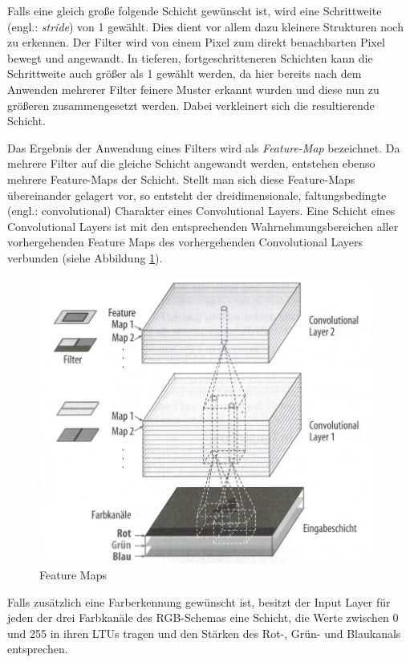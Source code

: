 Falls eine gleich große folgende Schicht gewünscht ist, wird eine Schrittweite (engl.: \textit{stride}) von 1 gewählt. Dies dient vor allem dazu kleinere Strukturen noch zu erkennen. Der Filter wird von einem Pixel zum direkt benachbarten Pixel bewegt und angewandt. In tieferen, fortgeschritteneren Schichten kann die Schrittweite auch größer als 1 gewählt werden, da hier bereits nach dem Anwenden mehrerer Filter feinere Muster erkannt wurden und diese nun zu größeren zusammengesetzt werden. Dabei verkleinert sich die resultierende Schicht. \cite[S. 362 f.]{AurelienGeron.2018}

Das Ergebnis der Anwendung eines Filters wird als \textit{Feature-Map} bezeichnet. Da mehrere Filter auf die gleiche Schicht angewandt werden, entstehen ebenso mehrere Feature-Maps der Schicht. Stellt man sich diese Feature-Maps übereinander gelagert vor, so entsteht der dreidimensionale, \glqq faltungsbedingte\grqq{} (engl.: convolutional) Charakter eines Convolutional Layers. Eine Schicht eines Convolutional Layers ist mit den entsprechenden Wahrnehmungsbereichen aller vorhergehenden Feature Maps des vorhergehenden Convolutional Layers verbunden (siehe Abbildung \ref{feature_maps}). \cite[S. 363 f.]{AurelienGeron.2018}

\begin{figure}[ht]
	\begin{center}
		\includegraphics[width=11cm]{Bilder/feature_maps.jpeg} 
		\caption[Feature Maps]{Feature Maps \cite{AurelienGeron.2018}}
		\label{feature_maps}
	\end{center}
\end{figure}

Falls zusätzlich eine Farberkennung gewünscht ist, besitzt der Input Layer für jeden der drei Farbkanäle des RGB-Schemas eine Schicht, die Werte zwischen 0 und 255 in ihren LTUs tragen und den Stärken des Rot-, Grün- und Blaukanals entsprechen. \cite[S. 364 f.]{AurelienGeron.2018}

